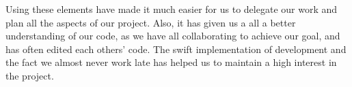 Using these elements have made it much easier for us to delegate our work and plan all the aspects of our project. Also, it has given us a all a better understanding of our code, as we have all collaborating to achieve our goal, and has often edited each others' code. The swift implementation of development and the fact we almost never work late has helped us to maintain a high interest in the project.